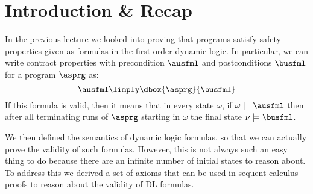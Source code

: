 \documentclass[11pt,twoside]{scrartcl}
\begin{document}
\newcommand{\atrace}{\sigma}%
\newcommand{\stdI}{\dTLint[state=\omega]}%
\newcommand{\Ip}{\dTLint[trace=\atrace]}%
\newcommand{\ws}{\omega}\newcommand{\wt}{\nu}%

\maketitle
\thispagestyle{empty}


\section{Introduction \& Recap}

In the previous lecture we looked into proving that programs satisfy safety properties given as formulas in the first-order dynamic logic. In particular, we can write contract properties with precondition $\ausfml$ and postconditions $\busfml$ for a program $\asprg$ as:
\begin{equation}
\ausfml \limply \dbox{\asprg}{\busfml}
\end{equation}
If this formula is valid, then it means that in every state $\omega$, if $\omega\models\ausfml$ then after all terminating runs of $\asprg$ starting in $\omega$ the final state $\nu\models\busfml$. 

We then defined the semantics of dynamic logic formulas, so that we can actually prove the validity of such formulas. However, this is not always such an easy thing to do because there are an infinite number of initial states to reason about. To address this we derived a set of axioms that can be used in sequent calculus proofs to reason about the validity of DL formulas. 
\end{document}
